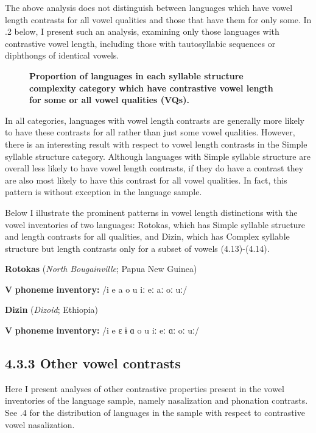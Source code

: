   The above analysis does not distinguish between languages which have vowel length contrasts for all vowel qualities and those that have them for only some. In .2 below, I present such an analysis, examining only those languages with contrastive vowel length, including those with tautosyllabic sequences or diphthongs of identical vowels.

\begin{figure}

\textbf{ Proportion of languages in each syllable structure complexity category which have contrastive vowel length for some or all vowel qualities (VQs).}
\end{figure}

  In all categories, languages with vowel length contrasts are generally more likely to have these contrasts for all rather than just some vowel qualities. However, there is an interesting result with respect to vowel length contrasts in the Simple syllable structure category. Although languages with Simple syllable structure are overall less likely to have vowel length contrasts, if they do have a contrast they are also most likely to have this contrast for all vowel qualities. In fact, this pattern is without exception in the language sample.

  Below I illustrate the prominent patterns in vowel length distinctions with the vowel inventories of two languages: Rotokas, which has Simple syllable structure and length contrasts for all qualities, and Dizin, which has Complex syllable structure but length contrasts only for a subset of vowels (4.13)-(4.14).

\ea\label{ex:(4.13)}
  \textbf{Rotokas} (\textit{North} \textit{Bougainville}; Papua New Guinea)

\textbf{V} \textbf{phoneme} \textbf{inventory:} /i e a o u iː eː aː oː uː/
\z

\ea\label{ex:(4.14)}
  \textbf{Dizin} (\textit{Dizoid}; Ethiopia)

\textbf{V} \textbf{phoneme} \textbf{inventory:} /i e ɛ ɨ ɑ o u iː eː ɑː oː uː/
\z

\subsection{4.3.3 Other vowel contrasts}

  Here I present analyses of other contrastive properties present in the vowel inventories of the language sample, namely nasalization and phonation contrasts. See .4 for the distribution of languages in the sample with respect to contrastive vowel nasalization.

